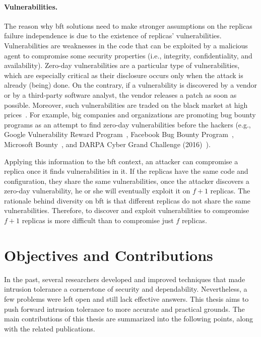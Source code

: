 \paragraph{Vulnerabilities.}
The reason why \gls{bft} solutions need to make stronger assumptions on the replicas failure independence is due to the existence of replicas' vulnerabilities.
Vulnerabilities are weaknesses in the code that can be exploited by a malicious agent to compromise some security properties (i.e., integrity, confidentiality, and availability).
Zero-day vulnerabilities are a particular type of vulnerabilities, which are especially critical as their disclosure occurs only when the attack is already (being) done.
On the contrary, if a vulnerability is discovered by a vendor or by a third-party software analyst, the vendor releases a patch as soon as possible. 
Moreover, such vulnerabilities are traded on the black market at high prices~\cite{Symantec:2017,Allodi:2017}.
For example, big companies and organizations are promoting bug bounty programs as an attempt to find zero-day vulnerabilities before the hackers (e.g., Google Vulnerability Reward Program~\cite{google_reward}, Facebook Bug Bounty Program~\cite{facebook_whitehat}, Microsoft Bounty~\cite{microsoft_bounty}, and DARPA Cyber Grand Challenge (2016)~\cite{darpa}).



Applying this information to the \gls{bft} context, an attacker can compromise a replica once it finds vulnerabilities in it.
If the replicas have the same code and configuration, they share the same vulnerabilities, once the attacker discovers a zero-day vulnerability, he or she will eventually exploit it on $f+1$ replicas.
The rationale behind diversity on \gls{bft} is that different replicas do not share the same vulnerabilities. 
Therefore, to discover and exploit vulnerabilities to compromise $f+1$ replicas is more difficult than to compromise just $f$ replicas.




\section{Objectives and Contributions}

In the past, several researchers developed and improved techniques that made intrusion tolerance a cornerstone of security and dependability.
Nevertheless, a few problems were left open and still lack effective answers.
This thesis aims to push forward intrusion tolerance to more accurate and practical grounds.
The main contributions of this thesis are summarized into the following points, along with the related publications.


